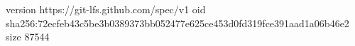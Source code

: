 version https://git-lfs.github.com/spec/v1
oid sha256:72ecfeb43c5be3b0389373bb052477e625ce453d0fd319fce391aad1a06b46e2
size 87544
